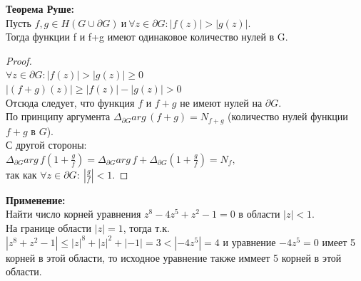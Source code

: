 \textbf{Теорема Руше:}\\
Пусть $f,g \in H(G \cup \partial G) \ \textrm{и} \ \forall z \in \partial G: |f(z)| > |g(z)|$. \\
Тогда функции f и f+g имеют одинаковое количество нулей в G.\\[2mm]

\begin{proof}
    \ \\
    $\forall z \in \partial G: |f(z)|>|g(z)|\geq 0$\\
    $|(f+g)(z)| \geq |f(z)| - |g(z)| > 0$\\
    Отсюда следует, что функция $f$ и $f+g$ не имеют нулей на $\partial G$.\\
    По принципу аргумента $\Delta_{\partial G}arg\, (f+g) = N_{f+g}$ (количество нулей функции $f+g$ в $G$).\\
    С другой стороны:\\
    $\Delta_{\partial G} arg\, f(1+\frac{g}{f})=\Delta_{\partial G} arg\, f+\Delta_{\partial G}(1+\frac{g}{f})=N_f,$\\
    так как $\forall z \in \partial G: \ \left|\frac{g}{f}\right|<1.$

    
\end{proof}
\textbf{Применение:}\\
Найти число корней уравнения $z^8-4z^5+z^2-1=0$ в области $|z|<1$.\\
На границе области $|z|=1$, тогда т.к. $|z^8+z^2-1|\leq |z|^8+|z|^2+|-1|=3 < |-4z^5|=4$ и уравнение $-4z^5=0$ имеет 5 корней в этой области, то исходное уравнение также иммеет 5 корней в этой области.
